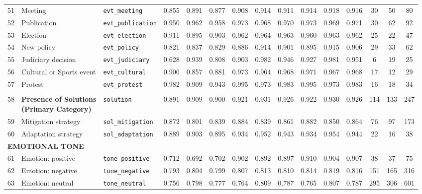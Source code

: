 \begin{longtable}{p{0.4cm}p{4.0cm}p{3.0cm}cccccccccccc}
51 & Meeting & \texttt{evt\_meeting} & 0.855 & 0.891 & 0.877 & 0.908 & 0.914 & 0.911 & 0.914 & 0.918 & 0.916 & 30 & 50 & 80 \\
52 & Publication & \texttt{evt\_publication} & 0.950 & 0.962 & 0.958 & 0.973 & 0.968 & 0.970 & 0.973 & 0.969 & 0.971 & 30 & 62 & 92 \\
53 & Election & \texttt{evt\_election} & 0.911 & 0.895 & 0.903 & 0.962 & 0.964 & 0.963 & 0.960 & 0.963 & 0.962 & 25 & 22 & 47 \\
54 & New policy & \texttt{evt\_policy} & 0.821 & 0.837 & 0.829 & 0.886 & 0.914 & 0.901 & 0.895 & 0.915 & 0.906 & 29 & 33 & 62 \\
55 & Judiciary decision & \texttt{evt\_judiciary} & 0.628 & 0.939 & 0.808 & 0.903 & 0.982 & 0.946 & 0.927 & 0.981 & 0.951 & 6 & 19 & 25 \\
56 & Cultural or Sports event & \texttt{evt\_cultural} & 0.906 & 0.857 & 0.881 & 0.973 & 0.964 & 0.968 & 0.971 & 0.967 & 0.968 & 17 & 12 & 29 \\
57 & Protest & \texttt{evt\_protest} & 0.982 & 0.909 & 0.943 & 0.995 & 0.973 & 0.983 & 0.995 & 0.973 & 0.983 & 16 & 18 & 34 \\
\midrule
\rowcolor{gray!8}
\multicolumn{15}{l}{\textit{Solutions}} \\
\midrule
58 & \textbf{Presence of Solutions\newline (Primary Category)} & \texttt{solution} & 0.891 & 0.909 & 0.900 & 0.921 & 0.931 & 0.926 & 0.922 & 0.930 & 0.926 & 114 & 133 & 247 \\
\cmidrule(lr){1-15}
59 & Mitigation strategy & \texttt{sol\_mitigation} & 0.872 & 0.801 & 0.839 & 0.884 & 0.839 & 0.861 & 0.882 & 0.850 & 0.864 & 76 & 97 & 173 \\
60 & Adaptation strategy & \texttt{sol\_adaptation} & 0.889 & 0.903 & 0.895 & 0.934 & 0.952 & 0.943 & 0.934 & 0.954 & 0.944 & 22 & 16 & 38 \\
\midrule
\multicolumn{15}{l}{\cellcolor{gray!10}\textbf{EMOTIONAL TONE}} \\
\midrule
61 & Emotion: positive & \texttt{tone\_positive} & 0.712 & 0.692 & 0.702 & 0.902 & 0.892 & 0.897 & 0.910 & 0.904 & 0.907 & 38 & 37 & 75 \\
62 & Emotion: negative & \texttt{tone\_negative} & 0.793 & 0.804 & 0.799 & 0.807 & 0.813 & 0.810 & 0.814 & 0.819 & 0.816 & 151 & 165 & 316 \\
63 & Emotion: neutral & \texttt{tone\_neutral} & 0.756 & 0.798 & 0.777 & 0.764 & 0.809 & 0.787 & 0.765 & 0.807 & 0.787 & 295 & 306 & 601 \\

\end{longtable}
